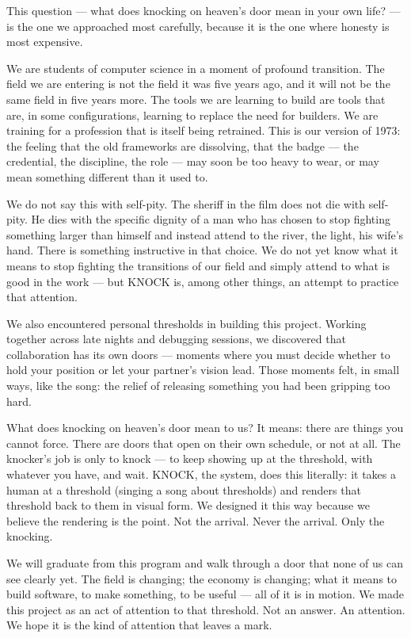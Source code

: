 \documentclass[12pt, a4paper]{article}
\begin{document}
This question --- what does knocking on heaven's door mean in your own life? --- is
the one we approached most carefully, because it is the one where honesty is most
expensive.

We are students of computer science in a moment of profound transition. The field we
are entering is not the field it was five years ago, and it will not be the same field
in five years more. The tools we are learning to build are tools that are, in some
configurations, learning to replace the need for builders. We are training for a
profession that is itself being retrained. This is our version of 1973: the feeling
that the old frameworks are dissolving, that the badge --- the credential, the
discipline, the role --- may soon be too heavy to wear, or may mean something
different than it used to.

We do not say this with self-pity. The sheriff in the film does not die with
self-pity. He dies with the specific dignity of a man who has chosen to stop fighting
something larger than himself and instead attend to the river, the light, his wife's
hand. There is something instructive in that choice. We do not yet know what it means
to stop fighting the transitions of our field and simply attend to what is good in
the work --- but KNOCK is, among other things, an attempt to practice that attention.

We also encountered personal thresholds in building this project. Working together
across late nights and debugging sessions, we discovered that collaboration has its
own doors --- moments where you must decide whether to hold your position or let your
partner's vision lead. Those moments felt, in small ways, like the song: the relief
of releasing something you had been gripping too hard.

What does knocking on heaven's door mean to us? It means: there are things you cannot
force. There are doors that open on their own schedule, or not at all. The knocker's
job is only to knock --- to keep showing up at the threshold, with whatever you have,
and wait. KNOCK, the system, does this literally: it takes a human at a threshold
(singing a song about thresholds) and renders that threshold back to them in visual
form. We designed it this way because we believe the rendering is the point.
Not the arrival. Never the arrival. Only the knocking.

We will graduate from this program and walk through a door that none of us can see
clearly yet. The field is changing; the economy is changing; what it means to build
software, to make something, to be useful --- all of it is in motion. We made this
project as an act of attention to that threshold. Not an answer. An attention.
We hope it is the kind of attention that leaves a mark.
\end{document}
